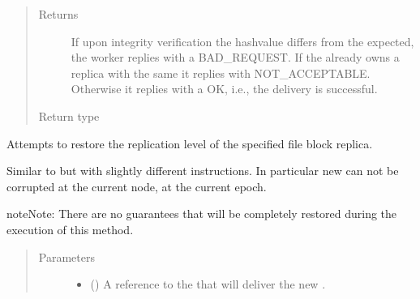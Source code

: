 \documentclass[letterpaper,10pt,english]{sphinxmanual}
\begin{document}
\begin{fulllineitems}
\begin{fulllineitems}
\begin{quote}
\begin{description}
\item[{Returns}] \leavevmode
If upon integrity verification the 
hashvalue differs from the expected, the worker replies with
a BAD\_REQUEST. If the  already owns a replica with the
same {\hyperref[\detokenize{app.domain.helpers:app.domain.helpers.smart_dataclasses.FileBlockData.id}]{}} it
replies with NOT\_ACCEPTABLE. Otherwise it replies with a OK,
i.e., the delivery is successful.

\item[{Return type}] \leavevmode
{\hyperref[\detokenize{app.domain.helpers:app.domain.helpers.enums.HttpCodes}]{}}

\end{description}\end{quote}

\end{fulllineitems}


\begin{fulllineitems}
\label{\detokenize{app.domain:app.domain.network_nodes.Node.replicate_part}}
Attempts to restore the replication level of the specified file
block replica.

Similar to {\hyperref[\detokenize{app.domain:app.domain.network_nodes.Node.send_part}]{}} but with
slightly different instructions. In particular new 
can not be corrupted at the current node, at the current epoch.

\begin{sphinxadmonition}{note}{Note:}
There are no guarantees that
{\hyperref[\detokenize{app:app.environment_settings.REPLICATION_LEVEL}]{}} will be
completely restored during the execution of this method.
\end{sphinxadmonition}
\begin{quote}\begin{description}
\item[{Parameters}] \leavevmode\begin{itemize}
\item {} 
 ({\hyperref[\detokenize{app:app.type_hints.ClusterType}]{}}) \textendash{} A reference to the
{\hyperref[\detokenize{app.domain:app.domain.cluster_groups.Cluster}]{}} that will
deliver the new .


\end{itemize}
\end{description}
\end{quote}
\end{fulllineitems}
\end{fulllineitems}
\end{document}
